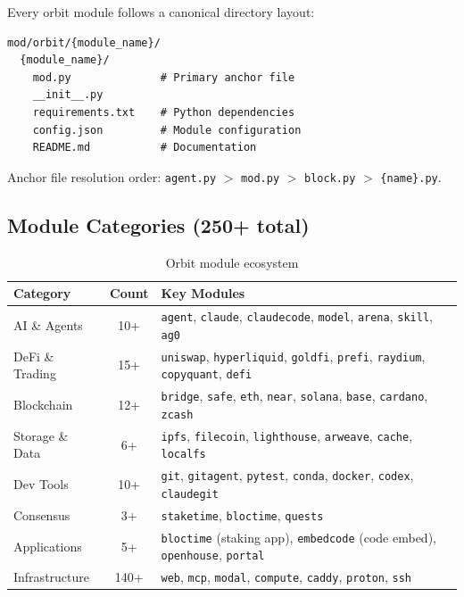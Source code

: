 \documentclass[11pt,a4paper]{article}
\begin{document}
Every orbit module follows a canonical directory layout:

\begin{lstlisting}[basicstyle=\ttfamily\small, frame=single, backgroundcolor=\color{codebg}]
mod/orbit/{module_name}/
  {module_name}/
    mod.py              # Primary anchor file
    __init__.py
    requirements.txt    # Python dependencies
    config.json         # Module configuration
    README.md           # Documentation
\end{lstlisting}

Anchor file resolution order: \texttt{agent.py} $>$ \texttt{mod.py} $>$ \texttt{block.py} $>$ \texttt{\{name\}.py}.

\subsection{Module Categories (250+ total)}

\begin{table}[H]
\centering
\begin{tabularx}{\textwidth}{lcX}
\toprule
\textbf{Category} & \textbf{Count} & \textbf{Key Modules} \\
\midrule
AI \& Agents & 10+ & \texttt{agent}, \texttt{claude}, \texttt{claudecode}, \texttt{model}, \texttt{arena}, \texttt{skill}, \texttt{ag0} \\
DeFi \& Trading & 15+ & \texttt{uniswap}, \texttt{hyperliquid}, \texttt{goldfi}, \texttt{prefi}, \texttt{raydium}, \texttt{copyquant}, \texttt{defi} \\
Blockchain & 12+ & \texttt{bridge}, \texttt{safe}, \texttt{eth}, \texttt{near}, \texttt{solana}, \texttt{base}, \texttt{cardano}, \texttt{zcash} \\
Storage \& Data & 6+ & \texttt{ipfs}, \texttt{filecoin}, \texttt{lighthouse}, \texttt{arweave}, \texttt{cache}, \texttt{localfs} \\
Dev Tools & 10+ & \texttt{git}, \texttt{gitagent}, \texttt{pytest}, \texttt{conda}, \texttt{docker}, \texttt{codex}, \texttt{claudegit} \\
Consensus & 3+ & \texttt{staketime}, \texttt{bloctime}, \texttt{quests} \\
Applications & 5+ & \texttt{bloctime} (staking app), \texttt{embedcode} (code embed), \texttt{openhouse}, \texttt{portal} \\
Infrastructure & 140+ & \texttt{web}, \texttt{mcp}, \texttt{modal}, \texttt{compute}, \texttt{caddy}, \texttt{proton}, \texttt{ssh} \\
\bottomrule
\end{tabularx}
\caption{Orbit module ecosystem}
\end{table}
\end{document}
